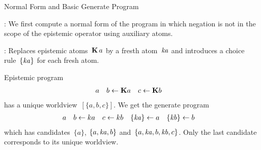 \documentclass[aspectratio=169,svgnames,xcolor=table,t]{beamer}
\begin{document}
\begin{frame}{Normal Form and Basic Generate Program}
    \begin{myitemize}
        \item {}: We first compute a normal form of the program in which negation is not in the scope of the epistemic operator using auxiliary atoms.
        
        \item {}: Replaces epistemic atoms~$\mathbf{K}\,a$ by a fresth atom~$\mathit{ka}$ and introduces a choice rule~$\{ \mathit{ka} \}$ for each fresh atom.
    \end{myitemize}
    Epistemic program
    \begin{align*}
        a && 
        b &\leftarrow \mathbf{K} a
        &
        c &\leftarrow \mathbf{K} b
    \end{align*}
    has a unique worldview~$[\{a,b,c\}]$. 
    \pause
    We get the generate program
    \begin{align*}
        a 
        && 
        b &\leftarrow ka
        &
        c &\leftarrow kb
        &
        \{ \mathit{ka} \} &\leftarrow a
        &
        \{ \mathit{kb} \} &\leftarrow b
    \end{align*}
    which has candidates~$\{a\}$, $\{a,\mathit{ka},b\}$ and~$\{a,\mathit{ka},b,\mathit{kb},c\}$. Only the last candidate corresponds to its unique worldview.
\end{frame}

\newcommand{\lenitem}[2][.5\linewidth]{\parbox[t]{#1}{\strut #2\strut}}
\end{document}
